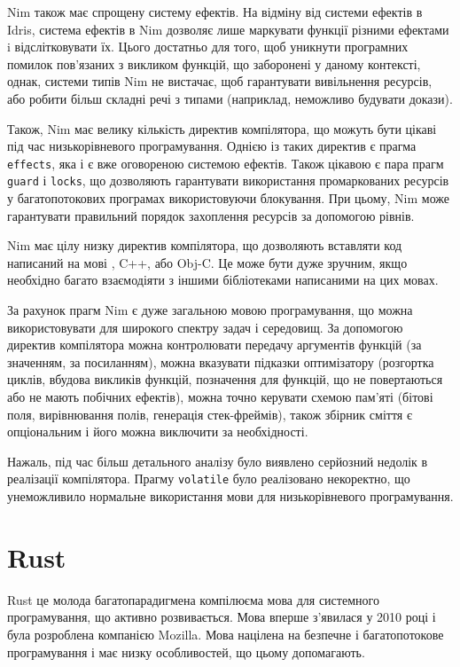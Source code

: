 \documentclass[oneside,14pt,a4paper,final]{myextreport}
\newcommand\code[1]{{\tt #1}}
\begin{document}
Nim також має спрощену систему ефектів. На відміну від системи ефектів в Idris, система ефектів в Nim дозволяє лише маркувати функції різними ефектами i відслітковувати їх. Цього достатньо для того, щоб уникнути програмних помилок пов'язаних з викликом функцій, що заборонені у даному контексті, однак, системи типів Nim не вистачає, щоб гарантувати вивільнення ресурсів, або робити більш складні речі з типами (наприклад, неможливо будувати докази).

Також, Nim має велику кількість директив компілятора\cite{nim:directives}, що можуть бути цікаві під час низькорівневого програмування. Однією із таких директив є прагма \code{effects}, яка і є вже оговореною системою ефектів. Також цікавою є пара прагм \code{guard} і \code{locks}, що дозволяють гарантувати використання промаркованих ресурсів у багатопотокових програмах використовуючи блокування. При цьому, Nim може гарантувати правильний порядок захоплення ресурсів за допомогою рівнів.

Nim має цілу низку директив компілятора, що дозволяють вставляти код написаний на мові \LangC{}, C++, або Obj-C. Це може бути дуже зручним, якщо необхідно багато взаємодіяти з іншими бібліотеками написаними на цих мовах.

За рахунок прагм Nim є дуже загальною мовою програмування, що можна використовувати для широкого спектру задач і середовищ. За допомогою директив компілятора можна контролювати передачу аргументів функцій (за значенням, за посиланням), можна вказувати підказки оптимізатору (розгортка циклів, вбудова викликів функцій, позначення для функцій, що не повертаються або не мають побічних ефектів), можна точно керувати схемою пам'яті (бітові поля, вирівнювання полів, генерація стек-фреймів), також збірник сміття є опціональним і його можна виключити за необхідності.

Нажаль, під час більш детального аналізу було виявлено серйозний недолік в реалізації компілятора. Прагму \code{volatile} було реалізовано некоректно\cite{nim:volatile}, що унеможливило нормальне використання мови для низькорівневого програмування.

\section{Rust}

Rust\cite{rust} це молода багатопарадигмена компілюєма мова для системного програмування, що активно розвивається. Мова вперше з'явилася у 2010 році і була розроблена компанією Mozilla\cite{rust:mozilla}. Мова націлена на безпечне і багатопотокове програмування і має низку особливостей, що цьому допомагають.
\end{document}
